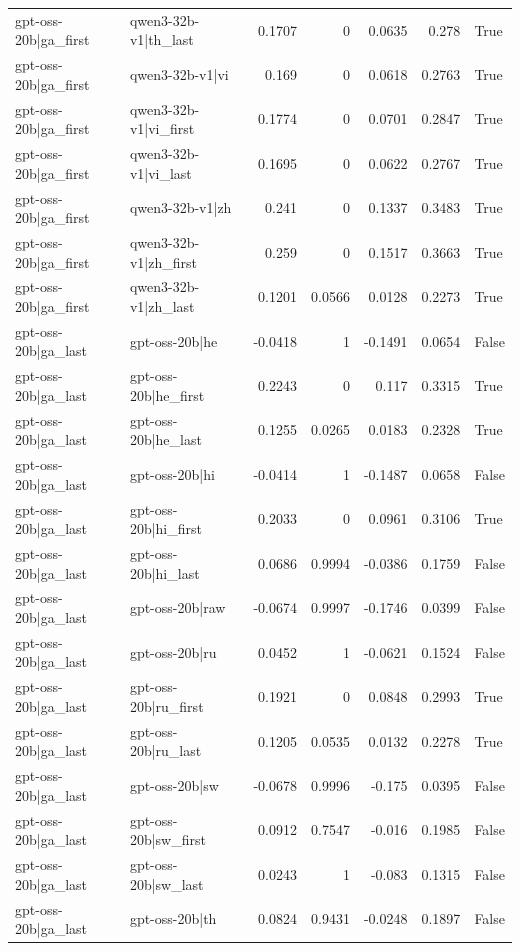 \begin{table}
\begin{tabular}{l l r r r r l}
gpt-oss-20b|ga_first & qwen3-32b-v1|th_last & 0.1707 & 0 & 0.0635 & 0.278 & True \\
gpt-oss-20b|ga_first & qwen3-32b-v1|vi & 0.169 & 0 & 0.0618 & 0.2763 & True \\
gpt-oss-20b|ga_first & qwen3-32b-v1|vi_first & 0.1774 & 0 & 0.0701 & 0.2847 & True \\
gpt-oss-20b|ga_first & qwen3-32b-v1|vi_last & 0.1695 & 0 & 0.0622 & 0.2767 & True \\
gpt-oss-20b|ga_first & qwen3-32b-v1|zh & 0.241 & 0 & 0.1337 & 0.3483 & True \\
gpt-oss-20b|ga_first & qwen3-32b-v1|zh_first & 0.259 & 0 & 0.1517 & 0.3663 & True \\
gpt-oss-20b|ga_first & qwen3-32b-v1|zh_last & 0.1201 & 0.0566 & 0.0128 & 0.2273 & True \\
gpt-oss-20b|ga_last & gpt-oss-20b|he & -0.0418 & 1 & -0.1491 & 0.0654 & False \\
gpt-oss-20b|ga_last & gpt-oss-20b|he_first & 0.2243 & 0 & 0.117 & 0.3315 & True \\
gpt-oss-20b|ga_last & gpt-oss-20b|he_last & 0.1255 & 0.0265 & 0.0183 & 0.2328 & True \\
gpt-oss-20b|ga_last & gpt-oss-20b|hi & -0.0414 & 1 & -0.1487 & 0.0658 & False \\
gpt-oss-20b|ga_last & gpt-oss-20b|hi_first & 0.2033 & 0 & 0.0961 & 0.3106 & True \\
gpt-oss-20b|ga_last & gpt-oss-20b|hi_last & 0.0686 & 0.9994 & -0.0386 & 0.1759 & False \\
gpt-oss-20b|ga_last & gpt-oss-20b|raw & -0.0674 & 0.9997 & -0.1746 & 0.0399 & False \\
gpt-oss-20b|ga_last & gpt-oss-20b|ru & 0.0452 & 1 & -0.0621 & 0.1524 & False \\
gpt-oss-20b|ga_last & gpt-oss-20b|ru_first & 0.1921 & 0 & 0.0848 & 0.2993 & True \\
gpt-oss-20b|ga_last & gpt-oss-20b|ru_last & 0.1205 & 0.0535 & 0.0132 & 0.2278 & True \\
gpt-oss-20b|ga_last & gpt-oss-20b|sw & -0.0678 & 0.9996 & -0.175 & 0.0395 & False \\
gpt-oss-20b|ga_last & gpt-oss-20b|sw_first & 0.0912 & 0.7547 & -0.016 & 0.1985 & False \\
gpt-oss-20b|ga_last & gpt-oss-20b|sw_last & 0.0243 & 1 & -0.083 & 0.1315 & False \\
gpt-oss-20b|ga_last & gpt-oss-20b|th & 0.0824 & 0.9431 & -0.0248 & 0.1897 & False \\

\end{tabular}
\end{table}
